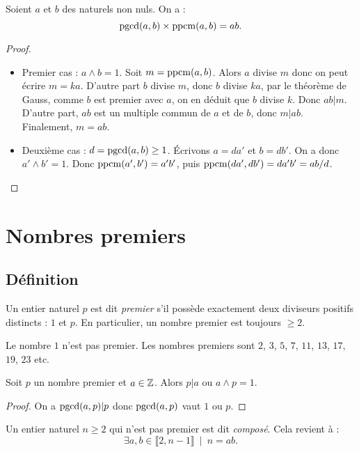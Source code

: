 \begin{proposition}
Soient $a$ et $b$ des naturels non nuls. On a :
\[ \operatorname{pgcd}(a,b)\times \operatorname{ppcm}(a,b) = ab.\]
\end{proposition}
\begin{proof}
\begin{itemize}
\item Premier cas : $a\wedge b = 1$. Soit $m = \operatorname{ppcm}(a,b)$. Alors $a$ divise $m$ donc on peut écrire $m = ka$. D'autre part $b$ divise $m$, donc $b$ divise $ka$, par le théorème de Gauss, comme $b$ est premier avec $a$, on en déduit que $b$ divise $k$. Donc $ab|m$. D'autre part, $ab$ est un multiple commun de $a$ et de $b$, donc $m|ab$. Finalement, $m = ab$.
\item Deuxième cas  : $d=\operatorname{pgcd}(a,b) \geq 1$. \'Ecrivons $a = da'$ et $b = db'$. On a donc $a'\wedge b'=1$. Donc $\operatorname{ppcm}(a',b')=a'b'$, puis $\operatorname{ppcm}(da',db') = da'b' = ab/d$.
\end{itemize}
\end{proof}



\section{Nombres premiers}

\subsection{Définition}

\begin{definition}
Un entier naturel $p$ est dit \emph{premier} s'il possède exactement deux diviseurs positifs distincts : $1$ et $p$.
En particulier, un nombre premier est toujours $\geq 2$.

\end{definition}


 Le nombre $1$ n'est pas premier. Les nombres premiers sont $2$, $3$, $5$, $7$, $11$, $13$, $17$, $19$, $23$ etc.
 
\begin{proposition} Soit $p$ un nombre premier et $a\in \mathbb{Z}$. Alors $p|a$ ou $a\wedge p = 1$.
\end{proposition}
\begin{proof}
On a $\operatorname{pgcd}(a,p)|p$ donc $\operatorname{pgcd}(a,p)$ vaut $1$ ou $p$.
\end{proof}


\begin{definition}
Un entier naturel $n\geq 2$ qui n'est pas premier est dit \emph{composé}. Cela revient à :
\[
\exists a, b \in \llbracket 2,n-1 \rrbracket \:\mid\: n=ab.
\]
\end{definition}

